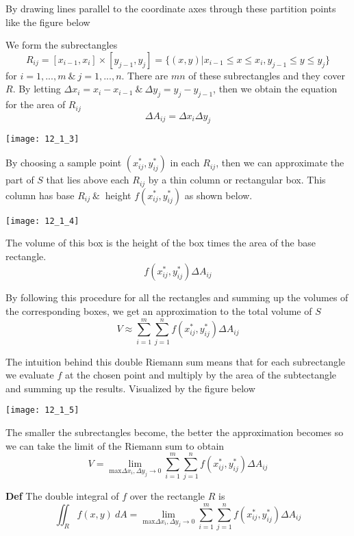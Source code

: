 \documentclass{article}
\begin{document}
  By drawing lines parallel to the coordinate axes through these partition points like the figure below

  We form the subrectangles
  \[
    R_{ij}= [x_{i-1},x_i] \times [y_{j-1},y_j] = \{ (x,y) | x_{i-1} \le x \le x_{i}, y_{j-1} \le y \le y_j \}
  \]
  for $ i=1,...,m ~\&~ j=1,...,n$. There are $ mn $ of these subrectangles and they cover $ R $. By letting $ \Delta x_i = x_i - x_{i-1} ~\&~ \Delta y_j = y_j - y_{j-1}$, then we obtain the equation for the area of $ R_{ij} $
  \[
    \Delta A_{ij}= \Delta x_{i} \Delta y_{j}
  \]

  \begin{center}
    \texttt{[image: 12\_1\_3]}
  \end{center}

  By choosing a sample point $ (x^{*}_{ij}, y^{*}_{ij}) $ in each $ R_{ij} $, then we can approximate the part of $ S $ that lies above each $ R_{ij} $ by a thin column or rectangular box. This column has base $ R_{ij} ~\&~ $ height $ f(x^{*}_{ij}, y^{*}_{ij}) $ as shown below.  

  \begin{center}
    \texttt{[image: 12\_1\_4]}
  \end{center}

  The volume of this box is the height of the box times the area of the base rectangle.
  \[
    f(x^{*}_{ij},y^{*}_{ij}) \Delta A_{ij}
  \]

  By following this procedure for all the rectangles and summing up the volumes of the corresponding boxes, we get an approximation to the total volume of $ S $
  \[
    V \approx \sum^{m}_{i=1} \sum^{n}_{j=1} f(x^{*}_{ij},y^{*}_{ij}) \Delta A_{ij}
  \]
  
  The intuition behind this double Riemann sum means that for each subrectangle we evaluate $ f $ at the chosen point and multiply by the area of the subtectangle and summing up the results. Visualized by the figure below
  \begin{center}
    \texttt{[image: 12\_1\_5]}
  \end{center}

  The smaller the subrectangles become, the better the approximation becomes so we can take the limit of the Riemann sum to obtain
  \[
    V = \lim_{\text{max}\Delta x_i, \Delta y_j \to 0}  \sum^{m}_{i=1} \sum^{n}_{j=1} f(x^{*}_{ij},y^{*}_{ij}) \Delta A_{ij}
  \]
 
  \textbf{Def}
  The double integral of $ f $ over the rectangle $ R $ is
  \[
    \iint_R f(x,y)~ dA = \lim_{\text{max}\Delta x_i, \Delta y_j \to 0}  \sum^{m}_{i=1} \sum^{n}_{j=1} f(x^{*}_{ij},y^{*}_{ij}) \Delta A_{ij}
  \]
\end{document}

